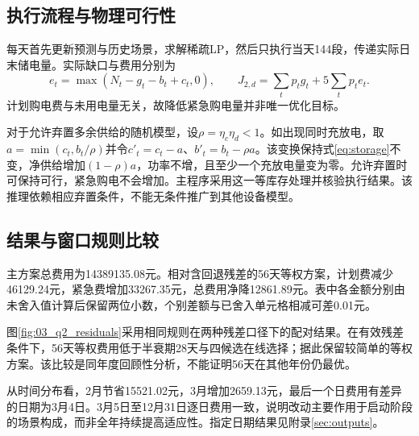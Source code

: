 \subsection{执行流程与物理可行性}
每天首先更新预测与历史场景，求解稀疏LP，然后只执行当天144段，传递实际日末储电量。实际缺口与费用分别为
\begin{equation}
e_t=\max(N_t-g_t-b_t+c_t,0),\qquad
J_{2,d}=\sum_t p_tg_t+5\sum_t p_te_t.\label{eq:q2settle}
\end{equation}
计划购电费与未用电量无关，故降低紧急购电量并非唯一优化目标。

对于允许弃置多余供给的随机模型，设$\rho=\eta_c\eta_d<1$。如出现同时充放电，取$a=\min(c_t,b_t/\rho)$并令$c'_t=c_t-a$、$b'_t=b_t-\rho a$。该变换保持式\eqref{eq:storage}不变，净供给增加$(1-\rho)a$，功率不增，且至少一个充放电量变为零。允许弃置时可保持可行，紧急购电不会增加。主程序采用这一等库存处理并核验执行结果。该推理依赖相应弃置条件，不能无条件推广到其他设备模型。

\subsection{结果与窗口规则比较}

主方案总费用为14389135.08元。相对含回退残差的56天等权方案，计划费减少46129.24元，紧急费增加33267.35元，总费用净降12861.89元。表中各金额分别由未舍入值计算后保留两位小数，个别差额与已舍入单元格相减可差0.01元。

图\ref{fig:03_q2_residuals}采用相同规则在两种残差口径下的配对结果。在有效残差条件下，56天等权费用低于半衰期28天与四候选在线选择；据此保留较简单的等权方案。该比较是同年度回顾性分析，不能证明56天在其他年份仍最优。

从时间分布看，2月节省15521.02元，3月增加2659.13元，最后一个日费用有差异的日期为3月4日。3月5日至12月31日逐日费用一致，说明改动主要作用于启动阶段的场景构成，而非全年持续提高适应性。指定日期结果见附录\ref{sec:outputs}。
\FloatBarrier
